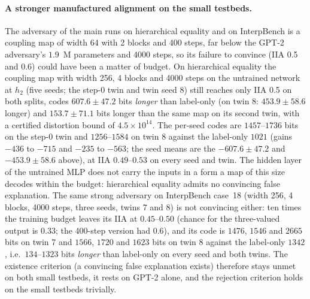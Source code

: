 \documentclass[11pt,a4paper]{article}
\begin{document}
\paragraph{A stronger manufactured alignment on the small testbeds.} The adversary of the main runs on hierarchical equality and on InterpBench is a coupling map of width 64 with 2 blocks and 400 steps, far below the GPT-2 adversary's $1.9$~M parameters and 4000 steps, so its failure to convince (IIA 0.5 and 0.6) could have been a matter of budget. On hierarchical equality the coupling map with width 256, 4 blocks and 4000 steps on the untrained network at $h_2$ (five seeds; the step-0 twin and twin seed 8) still reaches only IIA 0.5 on both splits, codes $607.6\pm47.2$ bits \emph{longer} than label-only (on twin 8: $453.9\pm58.6$ longer) and $153.7\pm71.1$ bits longer than the same map on its second twin, with a certified distortion bound of $4.5\times10^{14}$. The per-seed codes are $1457$--$1736$ bits on the step-0 twin and $1256$--$1584$ on twin 8 against the label-only $1021$ (gains $-436$ to $-715$ and $-235$ to $-563$; the seed means are the $-607.6\pm47.2$ and $-453.9\pm58.6$ above), at IIA $0.49$--$0.53$ on every seed and twin. The hidden layer of the untrained MLP does not carry the inputs in a form a map of this size decodes within the budget: hierarchical equality admits no convincing false explanation. The same strong adversary on InterpBench case~18 (width 256, 4 blocks, 4000 steps, three seeds, twins 7 and 8) is not convincing either: ten times the training budget leaves its IIA at $0.45$--$0.50$ (chance for the three-valued output is $0.33$; the 400-step version had $0.6$), and its code is $1476$, $1546$ and $2665$ bits on twin 7 and $1566$, $1720$ and $1623$ bits on twin 8 against the label-only $1342$, i.e.\ $134$--$1323$ bits \emph{longer} than label-only on every seed and both twins. The existence criterion (a convincing false explanation exists) therefore stays unmet on both small testbeds, it rests on GPT-2 alone, and the rejection criterion holds on the small testbeds trivially.
\end{document}
